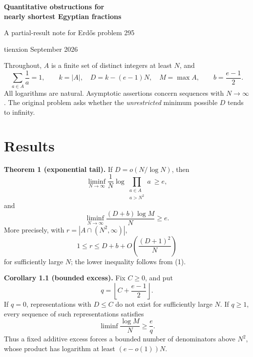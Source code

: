 \documentclass[11pt]{article}
\begin{document}
\begin{center}
{\LARGE\bfseries Quantitative obstructions for\\[4pt]
nearly shortest Egyptian fractions\par}
\vspace{8pt}
{\large A partial-result note for Erd\H{o}s problem 295\par}
\vspace{5pt}
tienxion \quad\textbullet{} September 2026
\end{center}
\begin{abstract}
For distinct integers at least \(N\) whose reciprocals sum to one, write
\(D\) for the excess length over \((e-1)N\).
We give an exponential-denominator obstruction when \(D\) is small,
an explicit lower bound of order \(N/\log N\) under each fixed polynomial
denominator ceiling, and stronger constants for subquadratic ceilings.
These restricted statements do not solve the unrestricted problem.
The methods have classical antecedents; novelty is not asserted.
\end{abstract}
Throughout, \(A\) is a finite set of distinct integers at least \(N\), and
\[
\sum_{a\in A}\frac1a=1,\qquad
k=|A|,\quad D=k-(e-1)N,\quad M=\max A,
\qquad b=\frac{e-1}{2}.
\]
All logarithms are natural. Asymptotic assertions concern sequences with \(N\to\infty\). The original problem asks whether the \emph{unrestricted} minimum possible \(D\) tends to infinity.

\section*{Results}

\textbf{Theorem 1 (exponential tail).} If \(D=o(N/\log N)\), then
\[
\liminf_{N\to\infty}\frac1N
 \log\!\prod_{\substack{a\in A\\a>N^2}}a\ \ge e, \tag{1}
\]
and
\[
\liminf_{N\to\infty}\frac{(D+b)\log M}{N}\ge e. \tag{2}
\]
More precisely, with \(r=|A\cap(N^2,\infty)|\),
\[
1\le r\le D+b+O\!\left(\frac{(D+1)^2}{N}\right)
\tag{3}
\]
for sufficiently large \(N\); the lower inequality follows from (1).

\textbf{Corollary 1.1 (bounded excess).} Fix \(C\ge0\), and put
\[
q=\left\lfloor C+\frac{e-1}{2}\right\rfloor.
\]
If \(q=0\), representations with \(D\le C\) do not exist for sufficiently large \(N\). If \(q\ge1\), every sequence of such representations satisfies
\[
\liminf\frac{\log M}{N}\ge\frac e q. \tag{4}
\]
Thus a fixed additive excess forces a bounded number of denominators above \(N^2\), whose product has logarithm at least \((e-o(1))N\). 
\end{document}
